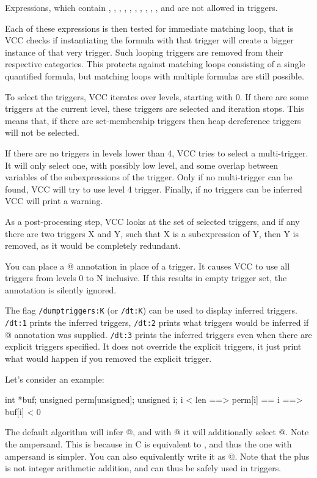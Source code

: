 Expressions, which contain \vcc{<=}, \vcc{>=}, \vcc{<}, \vcc{>}, \vcc{==},
\vcc{!=}, \vcc{||}, \vcc{&&}, \vcc{==>}, \vcc{<==>}, and \vcc{!} are not
allowed in triggers.

Each of these expressions is then tested for immediate matching loop,
that is VCC checks if instantiating the formula with that trigger
will create a bigger instance of that very trigger.
Such looping triggers are removed from their respective categories.
This protects against matching loops consisting of a single
quantified formula, but matching loops with multiple formulas
are still possible.

To select the triggers, VCC iterates over levels, starting with 0.
If there are some triggers at the current level, these triggers are selected
and iteration stops.
This means that, \eg if there are set-membership triggers then heap dereference
triggers will not be selected.

If there are no triggers in levels lower than 4, VCC tries to select a multi-trigger.
It will only select one, with possibly low level, and some overlap between variables
of the subexpressions of the trigger.
Only if no multi-trigger can be found, VCC will try to use level 4 trigger.
Finally, if no triggers can be inferred VCC will print a warning.

As a post-processing step, VCC looks at the set of selected triggers, and if
any there are two triggers X and Y, such that X is a subexpression of Y, then Y
is removed, as it would be completely redundant.

You can place a @ annotation in place of a trigger.
It causes VCC to use all triggers from levels 0 to N inclusive.
If this results in empty trigger set, the annotation is silently ignored.

The flag \texttt{/dumptriggers:K} (or \texttt{/dt:K}) can be used to display inferred
triggers.
\texttt{/dt:1} prints the inferred triggers,
\texttt{/dt:2} prints what triggers would be inferred if @ annotation
was supplied.
\texttt{/dt:3} prints the inferred triggers even when there are explicit triggers
specified. 
It does not override the explicit triggers, it just print what would happen if you
removed the explicit trigger.

Let's consider an example:
\begin{VCC}
int *buf;
unsigned perm[unsigned];
\forall unsigned i; i < len ==> perm[i] == i ==> buf[i] < 0
\end{VCC}
The default algorithm will infer @, and with @
it will additionally select @.
Note the ampersand.
This is because in C  is equivalent to , and thus
the one with ampersand is simpler.
You can also equivalently write it as @.
Note that the plus is not integer arithmetic addition, and can thus be safely used
in triggers.

